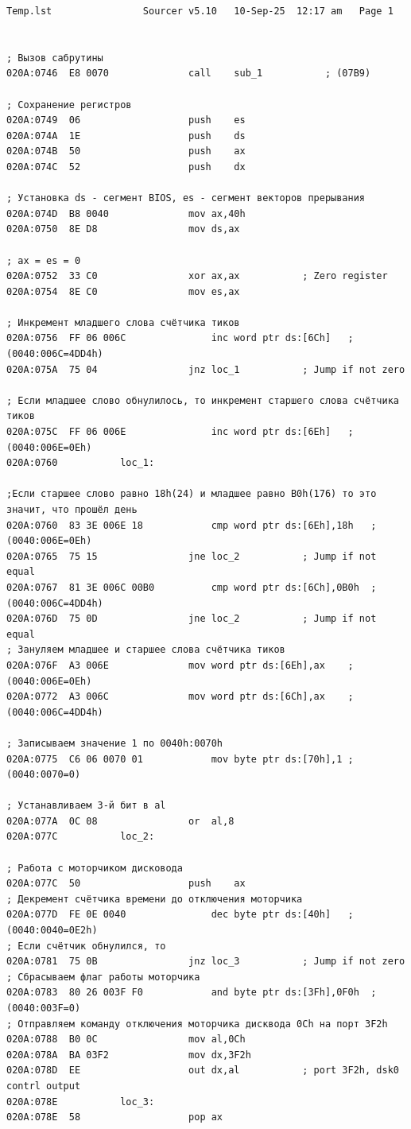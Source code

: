 	\begin{lstlisting}[style={asm}]
	Temp.lst				Sourcer	v5.10   10-Sep-25  12:17 am   Page 1


; Вызов сабрутины
020A:0746  E8 0070				call	sub_1			; (07B9)

; Сохранение регистров
020A:0749  06					push	es
020A:074A  1E					push	ds
020A:074B  50					push	ax
020A:074C  52					push	dx

; Установка ds - сегмент BIOS, es - сегмент векторов прерывания
020A:074D  B8 0040				mov	ax,40h
020A:0750  8E D8				mov	ds,ax

; ax = es = 0
020A:0752  33 C0				xor	ax,ax			; Zero register
020A:0754  8E C0				mov	es,ax

; Инкремент младшего слова счётчика тиков
020A:0756  FF 06 006C				inc	word ptr ds:[6Ch]	; (0040:006C=4DD4h)
020A:075A  75 04				jnz	loc_1			; Jump if not zero

; Если младшее слово обнулилось, то инкремент старшего слова счётчика тиков
020A:075C  FF 06 006E				inc	word ptr ds:[6Eh]	; (0040:006E=0Eh)
020A:0760			loc_1:

;Если старшее слово равно 18h(24) и младшее равно B0h(176) то это значит, что прошёл день
020A:0760  83 3E 006E 18			cmp	word ptr ds:[6Eh],18h	; (0040:006E=0Eh)
020A:0765  75 15				jne	loc_2			; Jump if not equal
020A:0767  81 3E 006C 00B0			cmp	word ptr ds:[6Ch],0B0h	; (0040:006C=4DD4h)
020A:076D  75 0D				jne	loc_2			; Jump if not equal
; Зануляем младшее и старшее слова счётчика тиков
020A:076F  A3 006E				mov	word ptr ds:[6Eh],ax	; (0040:006E=0Eh)
020A:0772  A3 006C				mov	word ptr ds:[6Ch],ax	; (0040:006C=4DD4h)

; Записываем значение 1 по 0040h:0070h
020A:0775  C6 06 0070 01			mov	byte ptr ds:[70h],1	; (0040:0070=0)

; Устанавливаем 3-й бит в al
020A:077A  0C 08				or	al,8
020A:077C			loc_2:

; Работа с моторчиком дисковода
020A:077C  50					push	ax
; Декремент счётчика времени до отключения моторчика
020A:077D  FE 0E 0040				dec	byte ptr ds:[40h]	; (0040:0040=0E2h)
; Если счётчик обнулился, то
020A:0781  75 0B				jnz	loc_3			; Jump if not zero
; Сбрасываем флаг работы моторчика
020A:0783  80 26 003F F0			and	byte ptr ds:[3Fh],0F0h	; (0040:003F=0)
; Отправляем команду отключения моторчика дисквода 0Ch на порт 3F2h
020A:0788  B0 0C				mov	al,0Ch
020A:078A  BA 03F2				mov	dx,3F2h
020A:078D  EE					out	dx,al			; port 3F2h, dsk0 contrl output
020A:078E			loc_3:
020A:078E  58					pop	ax


\end{lstlisting}
